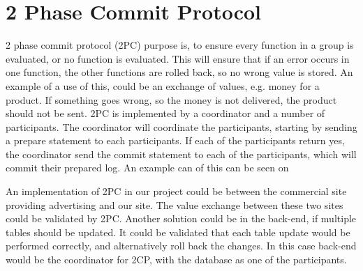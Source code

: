 \section{2 Phase Commit Protocol}
2 phase commit protocol (2PC) purpose is, to ensure every function in a group is evaluated, or no function is evaluated. This will ensure that if an error occurs in one function, the other functions are rolled back, so no wrong value is stored. An example of a use of this, could be an exchange of values, e.g. money for a product. If something goes wrong, so the money is not delivered, the product should not be sent.
2PC is implemented by a coordinator and a number of participants. The coordinator will coordinate the participants, starting by sending a prepare statement to each participants. If each of the participants return yes, the coordinator send the commit statement to each of the participants, which will commit their prepared log. An example can of this can be seen on 


An implementation of 2PC in our project could be between the commercial site providing advertising and our site. The value exchange between these two sites could be validated by 2PC. Another solution could be in the back-end, if multiple tables should be updated. It could be validated that each table update would be performed correctly, and alternatively roll back the changes. In this case back-end would be the coordinator for 2CP, with the database as one of the participants.